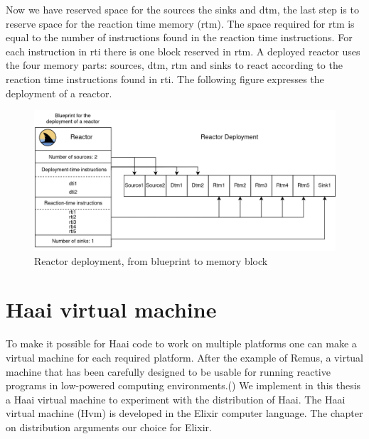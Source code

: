 \documentclass[a4paper]{book}
\begin{document}
Now we have reserved space for the sources the sinks and dtm, the last step is to reserve space for the reaction time memory (rtm). The space required for rtm is equal to the number of instructions found in the reaction time instructions. For each instruction in rti there is one block reserved in rtm. A deployed reactor uses the four memory parts: sources, dtm, rtm and sinks to react according to the reaction time instructions found in rti. The following figure expresses the deployment of a reactor.
     
\begin{figure}[h]
	\caption{Reactor deployment, from blueprint to memory block}
	\includegraphics[width=\textwidth]{rd.drawio}
\end{figure} 




\chapter{Haai virtual machine}
To make it possible for Haai code to work on multiple platforms one can make a virtual machine for each required platform. After the example of Remus, a virtual machine that has been carefully designed to be usable for running reactive programs in low-powered computing environments.(\cite{oeyen_remus_2022}) We implement in this thesis a Haai virtual machine to experiment with the distribution of Haai. The Haai virtual machine (Hvm) is developed in the Elixir computer language. The chapter on distribution arguments our choice for Elixir. 
\end{document}
